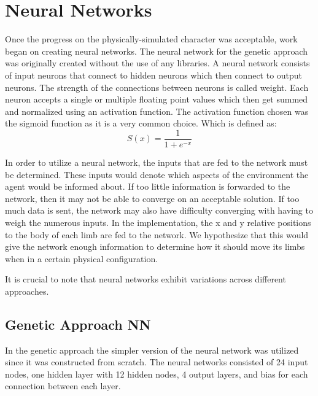 \documentclass[letterpaper]{article} %
\begin{document}
\section{Neural Networks}\label{nn}

\par Once the progress on the physically-simulated character was acceptable, work began on creating neural networks. The neural network for the genetic approach was originally created without the use of any libraries. A neural network consists of input neurons that connect to hidden neurons which then connect to output neurons. The strength of the connections between neurons is called weight. Each neuron accepts a single or multiple floating point values which then get summed and normalized using an activation function. The activation function chosen was the sigmoid function as it is a very common choice. Which is defined as:
$$
S(x)=\frac{1}{1+e^{-x}}
$$
\par In order to utilize a neural network, the inputs that are fed to the network must be determined. These inputs would denote which aspects of the environment the agent would be informed about. If too little information is forwarded to the network, then it may not be able to converge on an acceptable solution. If too much data is sent, the network may also have difficulty converging with having to weigh the numerous inputs. In the implementation, the x and y relative positions to the body of each limb are fed to the network. We hypothesize that this would give the network enough information to determine how it should move its limbs when in a certain physical configuration.
\par It is crucial to note that neural networks exhibit variations across different approaches. 

\subsection{Genetic Approach NN}
\par In the genetic approach the simpler version of the neural network was utilized since it was constructed from scratch. The neural networks consisted of 24 input nodes, one hidden layer with 12 hidden nodes, 4 output layers, and bias for each connection between each layer.
\end{document}
